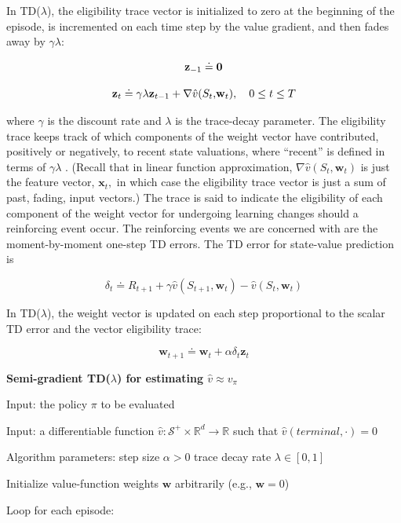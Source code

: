 \documentclass{article}
\begin{document}
In TD($\lambda$), the eligibility trace vector is initialized to zero at the beginning of the episode, is incremented on each time step by the value gradient, and then fades away by $\gamma\lambda$:

$$
{ \bf z } _ { - 1 } \doteq { \bf 0 }
$$

$$
{ \bf z } _ { t } \doteq \gamma \lambda { \bf z } _ { t - 1 } + \nabla \hat { v } ( S _ { t } { , } { \bf w } _ { t } ) , \quad 0 \leq t \leq T
$$

where $\gamma$ is the discount rate and $\lambda$ is the trace-decay parameter. The eligibility trace keeps track of which components of the weight vector have contributed, positively or negatively, 
to recent state valuations, where “recent” is defined in terms of $\gamma \lambda$ . (Recall that in linear function approximation, $\nabla \hat { v } ( S _ { t } , \mathbf { w } _ { t } )$ is just the feature vector, $\mathbf { x } _ { t } ,$ in which case the eligibility trace vector 
is just a sum of past, fading, input vectors.) The trace is said to indicate the eligibility of each component of the weight vector for undergoing learning changes should a reinforcing event occur. The reinforcing events we are concerned with are the moment-by-moment one-step TD errors. 
The TD error for state-value prediction is

$$
\delta _ { t } \doteq R _ { t + 1 } + \gamma \hat { v } ( S _ { t + 1 } { , } \mathbf { w } _ { t } ) - \hat { v } ( S _ { t } { , } \mathbf { w } _ { t } )
$$

In TD($\lambda$), the weight vector is updated on each step proportional to the scalar TD error and the vector eligibility trace:

$$
\mathbf { w } _ { t + 1 } \doteq \mathbf { w } _ { t } + \alpha \delta _ { t } \mathbf { z } _ { t }
$$

\textbf{Semi-gradient TD($\lambda$) for estimating $\hat{v} \approx v_\pi$}

Input: the policy $\pi$ to be evaluated

Input: a differentiable function $\hat { v } : \mathcal { S } ^ { + } \times \mathbb { R } ^ { d } \rightarrow \mathbb { R }$ such that $\hat{v}(terminal,\cdot) = 0$

Algorithm parameters: step size $\alpha > 0$ trace decay rate $\lambda \in [ 0 , 1 ]$

Initialize value-function weights $\mathbf { w }$ arbitrarily (e.g., $\mathbf { w } = 0$)

Loop for each episode:
\end{document}
